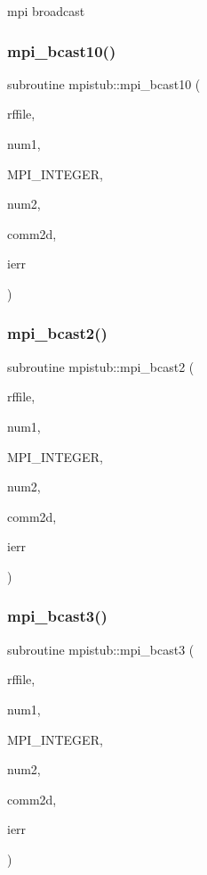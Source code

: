 mpi broadcast 

\mbox{\label{namespacempistub_a75581dd8d19054f24cda24cb93a956a3}} 
\subsubsection{\texorpdfstring{mpi\_bcast10()}{mpi\_bcast10()}}
{\footnotesize\ttfamily subroutine mpistub\+::mpi\+\_\+bcast10 (\begin{DoxyParamCaption}\item[{double complex}]{rffile,  }\item[{}]{num1,  }\item[{}]{M\+P\+I\+\_\+\+I\+N\+T\+E\+G\+ER,  }\item[{}]{num2,  }\item[{integer}]{comm2d,  }\item[{}]{ierr }\end{DoxyParamCaption})}

\mbox{\label{namespacempistub_a0d3b09e89256fef8bc0a4f71f7ff73c0}} 
\subsubsection{\texorpdfstring{mpi\_bcast2()}{mpi\_bcast2()}}
{\footnotesize\ttfamily subroutine mpistub\+::mpi\+\_\+bcast2 (\begin{DoxyParamCaption}\item[{double precision}]{rffile,  }\item[{}]{num1,  }\item[{}]{M\+P\+I\+\_\+\+I\+N\+T\+E\+G\+ER,  }\item[{}]{num2,  }\item[{integer}]{comm2d,  }\item[{}]{ierr }\end{DoxyParamCaption})}

\mbox{\label{namespacempistub_ae8d4cdea848159c537f06677e1d7b712}} 
\subsubsection{\texorpdfstring{mpi\_bcast3()}{mpi\_bcast3()}}
{\footnotesize\ttfamily subroutine mpistub\+::mpi\+\_\+bcast3 (\begin{DoxyParamCaption}\item[{integer, dimension(\+:)}]{rffile,  }\item[{}]{num1,  }\item[{}]{M\+P\+I\+\_\+\+I\+N\+T\+E\+G\+ER,  }\item[{}]{num2,  }\item[{integer}]{comm2d,  }\item[{}]{ierr }\end{DoxyParamCaption})}

